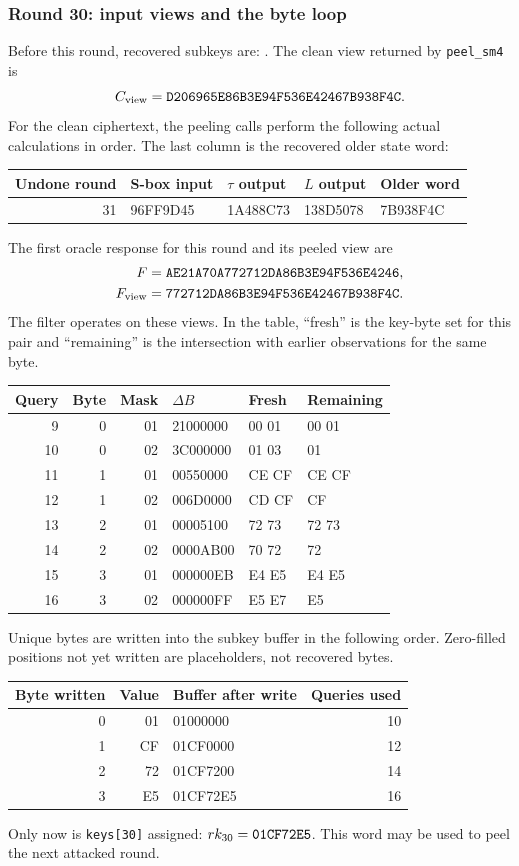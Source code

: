 \subsubsection*{Round 30: input views and the byte loop}
Before this round, recovered subkeys are:
.
The clean view returned by \texttt{peel\_sm4} is
\[C_{\rm view}=\texttt{D206965E86B3E94F536E42467B938F4C}.\]
For the clean ciphertext, the peeling calls perform the following actual calculations in order. The last column is the recovered older state word:
\begin{center}\small\begin{tabular}{rllll}\toprule
Undone round & S-box input & $\tau$ output & $L$ output & Older word\\\midrule
31 & 96FF9D45 & 1A488C73 & 138D5078 & 7B938F4C\\
\bottomrule\end{tabular}\end{center}
The first oracle response for this round and its peeled view are
\[\begin{aligned}F&=\texttt{AE21A70A772712DA86B3E94F536E4246},\\F_{\rm view}&=\texttt{772712DA86B3E94F536E42467B938F4C}.\end{aligned}\]
The filter operates on these views. In the table, ``fresh'' is the key-byte set for this pair and ``remaining'' is the intersection with earlier observations for the same byte.
\begin{center}\small\begin{tabular}{rrrlll}\toprule
Query & Byte & Mask & $\Delta B$ & Fresh & Remaining\\\midrule
9 & 0 & 01 & 21000000 & 00 01 & 00 01\\
10 & 0 & 02 & 3C000000 & 01 03 & 01\\
11 & 1 & 01 & 00550000 & CE CF & CE CF\\
12 & 1 & 02 & 006D0000 & CD CF & CF\\
13 & 2 & 01 & 00005100 & 72 73 & 72 73\\
14 & 2 & 02 & 0000AB00 & 70 72 & 72\\
15 & 3 & 01 & 000000EB & E4 E5 & E4 E5\\
16 & 3 & 02 & 000000FF & E5 E7 & E5\\
\bottomrule\end{tabular}\end{center}
Unique bytes are written into the subkey buffer in the following order. Zero-filled positions not yet written are placeholders, not recovered bytes.
\begin{center}\small\begin{tabular}{rrlr}\toprule
Byte written & Value & Buffer after write & Queries used\\\midrule
0 & 01 & 01000000 & 10\\
1 & CF & 01CF0000 & 12\\
2 & 72 & 01CF7200 & 14\\
3 & E5 & 01CF72E5 & 16\\
\bottomrule\end{tabular}\end{center}
Only now is \texttt{keys[30]} assigned: $rk_{30}=\texttt{01CF72E5}$. This word may be used to peel the next attacked round.
